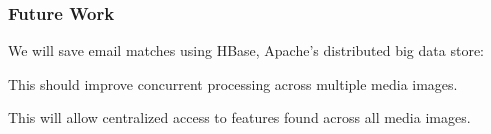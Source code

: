 \documentclass[12pt,twoside]{article}
\begin{document}
\subsubsection*{Future Work}
We will save email matches using HBase, Apache's distributed big data store:
\begin{compactitem}
\item This should improve concurrent processing across multiple media images.
\item This will allow centralized access to features found across all media images.
\end{compactitem}
\end{document}
